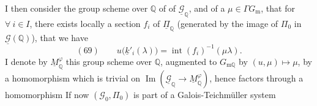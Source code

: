 I then consider the group scheme over $\mathbb Q$ of   of $\underline{\mathcal{G}}_{\mathbb Q}$, and of a $\mu\in\Gamma G_{\mathrm m}$,  that for $\forall\ i\in I$,  there exists locally a section $f_i$ of $\underline{\Pi}_{\mathbb Q}$ (generated by the image of $\Pi_0$ in $\underline{\mathcal{G}}(\mathbb Q)$),  that we have
\[
(69)\qquad u\bigl(\underline{k}'_i(\lambda)\bigr)=\operatorname{int}(f_i)^{-1}(\mu\lambda).
\]
I denote by $\underline{M}_{\mathbb Q}^{\varphi}$ this group scheme over $\mathbb Q$, augmented to $G_{\mathrm m\mathbb Q}$ by $(u,\mu)\longmapsto\mu$, by a homomorphism which is trivial on $\operatorname{Im}(\underline{\mathcal{G}}_{\mathbb Q}\to\underline{M}_{\mathbb Q}^{\varphi})$, hence factors through a homomorphism
If now $(\mathcal{G}_0,\Pi_0)$ is part of a Galois-Teichmüller system
